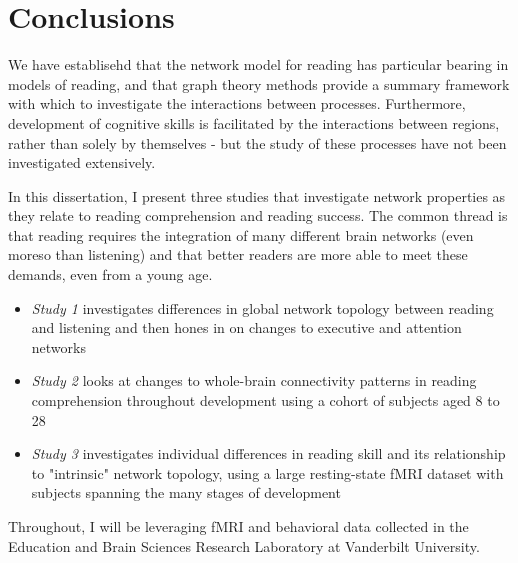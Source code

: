 \section{Conclusions}


We have establisehd that the network model for reading has particular bearing in models of reading, and that graph theory methods provide a summary framework with which to investigate the interactions between processes. Furthermore, development of cognitive skills is facilitated by the interactions between regions, rather than solely by themselves - but the study of these processes have not been investigated extensively. 

In this dissertation, I present three studies that investigate network properties as they relate to reading comprehension and reading success. The common thread is that reading requires the integration of many different brain networks (even moreso than listening) and that better readers are more able to meet these demands, even from a young age.

\begin{itemize}
    \item \textit{Study 1} investigates differences in global network topology between reading and listening and then hones in on changes to executive and attention networks 
    \item \textit{Study 2} looks at changes to whole-brain connectivity patterns in reading comprehension throughout development using a cohort of subjects aged 8 to 28
    \item \textit{Study 3} investigates individual differences in reading skill and its relationship to "intrinsic" network topology, using a large resting-state fMRI dataset with subjects spanning the many stages of development
\end{itemize}

Throughout, I will be leveraging fMRI and behavioral data collected in the Education and Brain Sciences Research Laboratory at Vanderbilt University. 

